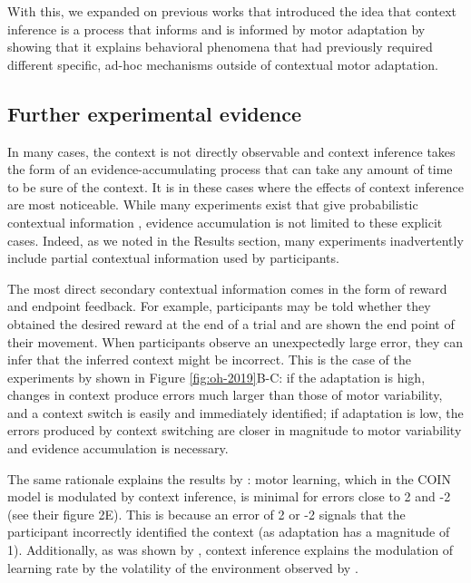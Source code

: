 \documentclass[a4paper,doc,floatsintext,natbib]{apa6}
\def \fref #1{Figure \ref{#1}}     %
\begin{document}
With this, we expanded on previous works that introduced the idea that context inference is a process that informs and is informed by motor adaptation by showing that it explains behavioral phenomena that had previously required different specific, ad-hoc mechanisms outside of contextual motor adaptation. 

\subsection{Further experimental evidence}
In many cases, the context is not directly observable and context inference takes the form of an evidence-accumulating process that can take any amount of time to be sure of the context. It is in these cases where the effects of context inference are most noticeable. While many experiments exist that give probabilistic contextual information \cite[e.g.][]{Scholz_uncontrolled_1999,Behrens_Learning_2007,Nassar_Dissociable_2019}, evidence accumulation is not limited to these explicit cases. Indeed, as we noted in the Results section, many experiments inadvertently include partial contextual information used by participants.

The most direct secondary contextual information comes in the form of reward and endpoint feedback. For example, participants may be told whether they obtained the desired reward at the end of a trial and are shown the end point of their movement. When participants observe an unexpectedly large error, they can infer that the inferred context might be incorrect. This is the case of the experiments by \cite{Oh_Minimizing_2019} shown in \fref{fig:oh-2019}B-C: if the adaptation is high, changes in context produce errors much larger than those of motor variability, and a context switch is easily and immediately identified; if adaptation is low, the errors produced by context switching are closer in magnitude to motor variability and evidence accumulation is necessary.

The same rationale explains the results by \cite{Herzfeld_memory_2014}: motor learning, which in the COIN model is modulated by context inference, is minimal for errors close to 2 and -2 (see their figure 2E). This is because an error of 2 or -2 signals that the participant incorrectly identified the context (as adaptation has a magnitude of 1). Additionally, as was shown by \cite{Heald_Contextual_2021}, context inference explains the modulation of learning rate by the volatility of the environment observed by \cite{Herzfeld_memory_2014}.
\end{document}
